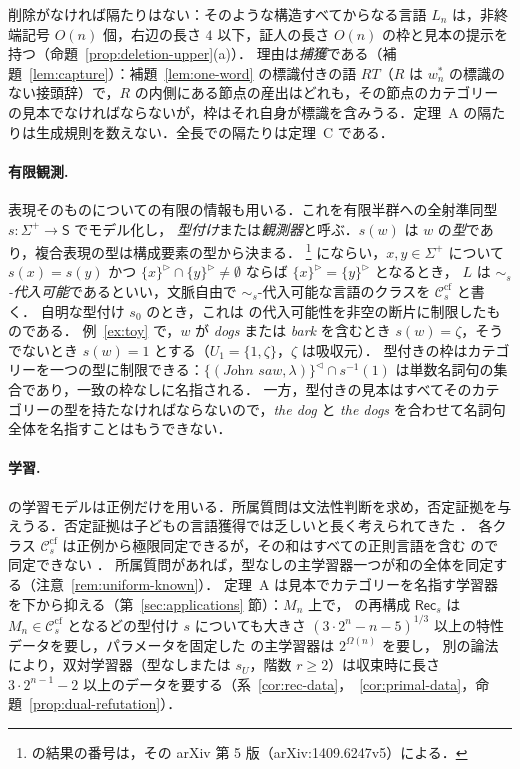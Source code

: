 \documentclass[11pt,a4paper]{ltjsarticle}
\numberwithin{equation}{section}
\theoremstyle{plain}
\theoremstyle{definition}
\theoremstyle{remark}
\theoremstyle{plain}
\newcommand{\eps}{\lambda}
\newcommand{\R}{^{\rhd}}
\newcommand{\Lc}{^{\lhd}}
\newcommand{\Ccf}[1]{\mathcal C^{\mathrm{cf}}_{#1}}
\begin{document}
削除がなければ隔たりはない：そのような構造すべてからなる言語 $L_n$ は，非終端記号 $O(n)$ 個，右辺の長さ $4$ 以下，証人の長さ $O(n)$ の枠と見本の提示を持つ（命題~\ref{prop:deletion-upper}(a)）．
理由は\emph{捕獲}である（補題~\ref{lem:capture}）：補題~\ref{lem:one-word} の標識付きの語 $RT$（$R$ は $w^*_n$ の標識のない接頭辞）で，$R$ の内側にある節点の産出はどれも，その節点のカテゴリーの見本でなければならないが，枠はそれ自身が標識を含みうる．定理~A の隔たりは生成規則を数えない．全長での隔たりは定理~C である．

\paragraph{有限観測.}
表現そのものについての有限の情報も用いる．これを有限半群への全射準同型 $s:\Sigma^+\to\mathsf S$ でモデル化し，
\emph{型付け}または\emph{観測器}と呼ぶ．$s(w)$ は $w$ の\emph{型}であり，複合表現の型は構成要素の型から決まる．
\citet[Def.~2.1]{kuriyama-tcs1}%
\footnote{\citet{kuriyama-tcs1} の結果の番号は，その arXiv 第 5 版（arXiv:1409.6247v5）による．}
にならい，$x,y\in\Sigma^+$ について $s(x)=s(y)$ かつ $\{x\}\R\cap\{y\}\R\ne\emptyset$ ならば $\{x\}\R=\{y\}\R$ となるとき，
$L$ は \emph{$\sim_s$-代入可能}であるといい，文脈自由で $\sim_s$-代入可能な言語のクラスを $\Ccf s$ と書く．
自明な型付け $s_0$ のとき，これは \citet{clark-eyraud2007} の代入可能性を非空の断片に制限したものである．
例~\ref{ex:toy} で，$w$ が \emph{dogs} または \emph{bark} を含むとき $s(w)=\zeta$，そうでないとき $s(w)=1$ とする（$U_1=\{1,\zeta\}$，$\zeta$ は吸収元）．
型付きの枠はカテゴリーを一つの型に制限できる：$\{(\textit{John saw},\eps)\}\Lc\cap s^{-1}(1)$ は単数名詞句の集合であり，一致の枠なしに名指される．
一方，型付きの見本はすべてそのカテゴリーの型を持たなければならないので，\emph{the dog} と \emph{the dogs} を合わせて名詞句全体を名指すことはもうできない．

\paragraph{学習.}
\citet{kuriyama-tcs1} の学習モデルは正例だけを用いる．所属質問は文法性判断を求め，否定証拠を与えうる．否定証拠は子どもの言語獲得では乏しいと長く考えられてきた \citep{marcus1993}．
各クラス $\Ccf s$ は正例から極限同定できるが，その和はすべての正則言語を含む \citep[Prop.~3.1]{kuriyama-tcs1} ので同定できない \citep{gold1967}．
所属質問があれば，型なしの主学習器一つが和の全体を同定する（注意~\ref{rem:uniform-known}）．
定理~A は見本でカテゴリーを名指す学習器を下から抑える（第~\ref{sec:applications} 節）：$M_n$ 上で，\citet{kuriyama-tcs1} の再構成 $\mathsf{Rec}_s$ は
$M_n\in\Ccf s$ となるどの型付け $s$ についても大きさ $(3\cdot2^n-n-5)^{1/3}$ 以上の特性データを要し，パラメータを固定した \citet{ky2017} の主学習器は $2^{\Omega(n)}$ を要し，
別の論法により，双対学習器（型なしまたは $s_U$，階数 $r\ge2$）は収束時に長さ $3\cdot2^{n-1}-2$ 以上のデータを要する（系~\ref{cor:rec-data}，~\ref{cor:primal-data}，命題~\ref{prop:dual-refutation}）．
\end{document}
